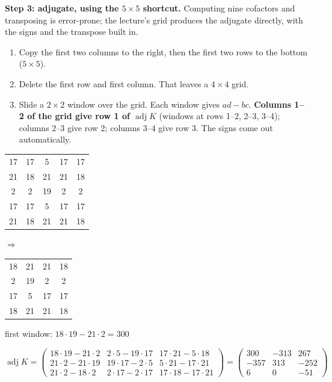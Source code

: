 \textbf{Step 3: adjugate, using the $5\times5$ shortcut.} Computing nine cofactors and transposing is error-prone; the lecture's grid produces the adjugate directly, with the signs and the transpose built in.
\begin{enumerate}[leftmargin=1.5em]
  \item Copy the first two columns to the right, then the first two rows to the bottom ($5\times5$).
  \item Delete the first row and first column. That leaves a $4\times4$ grid.
  \item Slide a $2\times2$ window over the grid. Each window gives $ad - bc$.
  \textbf{Columns 1--2 of the grid give row 1 of $\operatorname{adj}K$} (windows at rows 1--2, 2--3, 3--4); columns 2--3 give row 2; columns 3--4 give row 3. The signs come out automatically.
\end{enumerate}
\begin{center}\small
\begin{tabular}{ccccc}
\color{gray}17&\color{gray}17&\color{gray}5&\color{gray}17&\color{gray}17\\
\color{gray}21&18&21&21&18\\
\color{gray}2&2&19&2&2\\
\color{gray}17&17&5&17&17\\
\color{gray}21&18&21&21&18
\end{tabular}
\quad$\Rightarrow$\quad
\begin{tabular}{|cc|cc|}
\hline
\cellcolor{cyan!20}18&\cellcolor{cyan!20}21&21&18\\
\cellcolor{cyan!20}2&\cellcolor{cyan!20}19&2&2\\
17&5&17&17\\
18&21&21&18\\
\hline
\end{tabular}
\quad
{\footnotesize first window: $18\cdot19 - 21\cdot2 = 300$}
\end{center}
\[
\operatorname{adj}K =
\begin{pmatrix}
18\cdot19-21\cdot2 & 2\cdot5-19\cdot17 & 17\cdot21-5\cdot18\\
21\cdot2-21\cdot19 & 19\cdot17-2\cdot5 & 5\cdot21-17\cdot21\\
21\cdot2-18\cdot2 & 2\cdot17-2\cdot17 & 17\cdot18-17\cdot21
\end{pmatrix}
=
\begin{pmatrix}300&-313&267\\-357&313&-252\\6&0&-51\end{pmatrix}
\]
